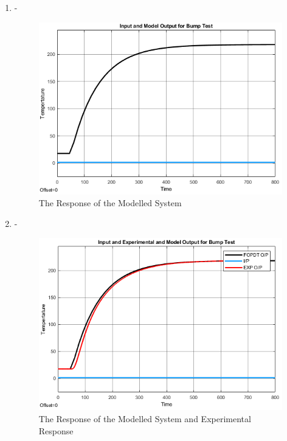 \documentclass[a4paper,12pt]{article}
\begin{document}
\begin{enumerate}
		\item  -
			
			\begin{figure}[H]
				\center
				\setlength{\unitlength}{\textwidth} 
				\includegraphics[width=0.7\unitlength]{images/fopdt}
				\caption{\label{fig:fopdt} The Response of the Modelled System }
			\end{figure}	
		
		\item -
			
			\begin{figure}[H]
				\center
				\setlength{\unitlength}{\textwidth} 
				\includegraphics[width=0.7\unitlength]{images/fopdt_vs_exp}
				\caption{\label{fig:fopdt} The Response of the Modelled System and Experimental Response }
			\end{figure}
			

\end{enumerate}
\end{document}
